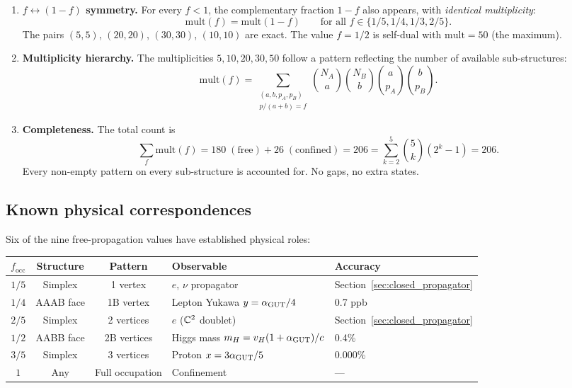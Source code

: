 \begin{enumerate}
\item \textbf{$f \leftrightarrow (1-f)$ symmetry.}  For every $f < 1$, the complementary fraction $1 - f$ also appears, with \emph{identical multiplicity}:
\begin{equation}
\mathrm{mult}(f) = \mathrm{mult}(1 - f) \qquad \text{for all } f \in \{1/5, 1/4, 1/3, 2/5\}.
\end{equation}
The pairs $(5, 5)$, $(20, 20)$, $(30, 30)$, $(10, 10)$ are exact.  The value $f = 1/2$ is self-dual with $\mathrm{mult} = 50$ (the maximum).

\item \textbf{Multiplicity hierarchy.}  The multiplicities $5, 10, 20, 30, 50$ follow a pattern reflecting the number of available sub-structures:
\begin{equation}
\mathrm{mult}(f) = \sum_{\substack{(a,b,p_A,p_B) \\ p/(a+b) = f}} \binom{N_A}{a}\binom{N_B}{b}\binom{a}{p_A}\binom{b}{p_B}.
\end{equation}

\item \textbf{Completeness.}  The total count is
\begin{equation}
\sum_f \mathrm{mult}(f) = 180\;(\text{free}) + 26\;(\text{confined}) = 206 = \sum_{k=2}^{5} \binom{5}{k}(2^k - 1) = 206.
\end{equation}
Every non-empty pattern on every sub-structure is accounted for.  No gaps, no extra states.
\end{enumerate}

\subsection{Known physical correspondences}
\label{sec:known_correspondences}

Six of the nine free-propagation values have established physical roles:

\begin{center}
\begin{tabular}{cccll}
\hline
$f_\mathrm{occ}$ & Structure & Pattern & Observable & Accuracy \\
\hline
$1/5$ & Simplex & 1 vertex & $e$, $\nu$ propagator & Section~\ref{sec:closed_propagator} \\
$1/4$ & AAAB face & 1B vertex & Lepton Yukawa $y = \alpha_{\mathrm{GUT}}/4$ & 0.7 ppb \\
$2/5$ & Simplex & 2 vertices & $e$ ($\mathbb{C}^2$ doublet) & Section~\ref{sec:closed_propagator} \\
$1/2$ & AABB face & 2B vertices & Higgs mass $m_H = v_H(1+\alpha_{\mathrm{GUT}})/c$ & 0.4\% \\
$3/5$ & Simplex & 3 vertices & Proton $x = 3\alpha_{\mathrm{GUT}}/5$ & 0.000\% \\
$1$   & Any & Full occupation & Confinement & --- \\
\hline
\end{tabular}
\end{center}

